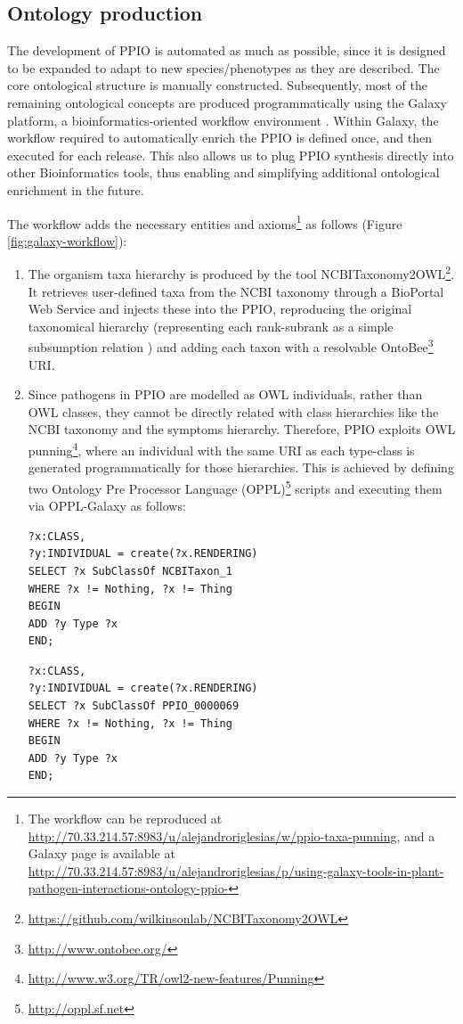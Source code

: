 \documentclass[sw]{iosart2c}
\newcommand{\myurl}[1]{\footnote{\url{#1}}}
\begin{document}
\subsection{Ontology production}
The development of PPIO is automated as much as possible, since it is designed to be expanded to adapt to new species/phenotypes as they are described. The core ontological structure is manually constructed. Subsequently, most of the remaining ontological concepts are produced programmatically using the Galaxy platform, a bioinformatics-oriented workflow environment \cite{galaxy}. Within Galaxy, the workflow required to automatically enrich the PPIO is defined once, and then executed for each release. This also allows us to plug PPIO synthesis directly into other Bioinformatics tools, thus enabling and simplifying additional ontological enrichment in the future.

The workflow adds the necessary entities and axioms\footnote{The workflow can be reproduced at \url{http://70.33.214.57:8983/u/alejandroriglesias/w/ppio-taxa-punning}, and a Galaxy page is available at \url{http://70.33.214.57:8983/u/alejandroriglesias/p/using-galaxy-tools-in-plant-pathogen-interactions-ontology-ppio-}} as follows (Figure \ref{fig:galaxy-workflow}):
\begin{enumerate}

\item The organism taxa hierarchy is produced by the tool NCBITaxonomy2OWL\myurl{https://github.com/wilkinsonlab/NCBITaxonomy2OWL}. It retrieves user-defined taxa from the NCBI taxonomy through a BioPortal Web Service \cite{bioportal} and injects these into the PPIO, reproducing the original taxonomical hierarchy (representing each rank-subrank as a simple subsumption relation \cite{taxa_ismb_2008}) and adding each taxon with a resolvable OntoBee\myurl{http://www.ontobee.org/} URI.

\item Since pathogens in PPIO are modelled as OWL individuals, rather than OWL classes, they cannot be directly related with class hierarchies like the NCBI taxonomy and the symptoms hierarchy. Therefore, PPIO exploits OWL punning\myurl{http://www.w3.org/TR/owl2-new-features/Punning}, where an individual with the same URI as each type-class is generated programmatically for those hierarchies. This is achieved by defining two Ontology Pre Processor Language (OPPL)\myurl{http://oppl.sf.net} scripts and executing them via OPPL-Galaxy \cite{OPPL-Galaxy-JBMS} as follows:

{\small 
\begin{verbatim}
?x:CLASS,
?y:INDIVIDUAL = create(?x.RENDERING)
SELECT ?x SubClassOf NCBITaxon_1
WHERE ?x != Nothing, ?x != Thing
BEGIN
ADD ?y Type ?x
END;
\end{verbatim}
}

{\small 
\begin{verbatim}
?x:CLASS,
?y:INDIVIDUAL = create(?x.RENDERING)
SELECT ?x SubClassOf PPIO_0000069
WHERE ?x != Nothing, ?x != Thing
BEGIN
ADD ?y Type ?x
END;
\end{verbatim}
}

\end{enumerate}
\end{document}
